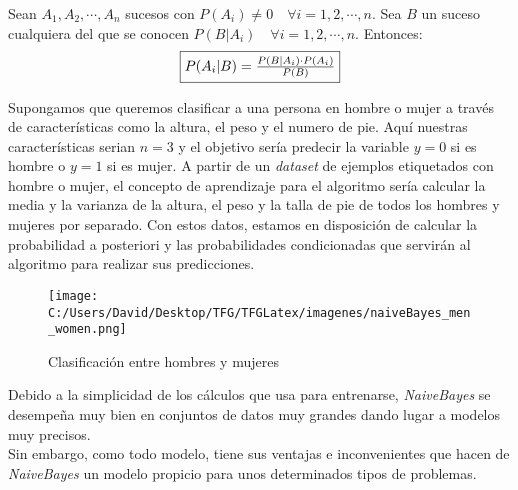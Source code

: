 \begin{theorem}
  Sean ${A_1, A_2, \cdots, A_n}$ sucesos con $P(A_i) \neq 0 \quad \forall i=1, 2, \cdots, n$. 
  Sea $B$ un suceso cualquiera del que se conocen $P(B|A_i) \quad \forall i=1, 2, \cdots, n$.
  Entonces:
  {\fboxsep 8pt\fboxrule 1pt
  \begin{equation*}
  \fbox{$ P(A_i|B) = \frac{P(B|A_i) \cdot P(A_i)}{P(B)} $}
  \end{equation*}
  }
\end{theorem}

Supongamos que queremos clasificar a una persona en hombre o mujer a través de características como 
la altura, el peso y el numero de pie. Aquí nuestras características serian $n=3$ y el objetivo 
sería predecir la variable $y=0$ si es hombre o $y=1$ si es mujer.
A partir de un \textit{dataset} de ejemplos etiquetados con hombre o mujer,
el concepto de aprendizaje para el algoritmo  sería calcular la media y la varianza 
de la altura, el peso y la talla de pie de todos los hombres y mujeres por separado.
Con estos datos, estamos en disposición de calcular la probabilidad a posteriori y las probabilidades 
condicionadas que servirán al algoritmo para realizar sus predicciones.

\begin{figure}[!htpb]
  \centering
  \texttt{[image: C:/Users/David/Desktop/TFG/TFGLatex/imagenes/naiveBayes\_men\_women.png]}
  \caption[Naive Bayes clasificación]{Clasificación entre hombres y mujeres}
  \label{men_women_boundary}
\end{figure}

Debido a la simplicidad de los cálculos que usa para entrenarse, \textit{NaiveBayes} se desempeña muy bien 
en conjuntos de datos muy grandes dando lugar a modelos muy precisos.\\
Sin embargo, como todo modelo, tiene sus ventajas e inconvenientes que hacen de \textit{NaiveBayes} un modelo 
propicio para unos determinados tipos de problemas.

